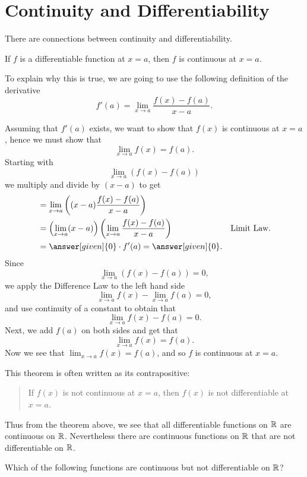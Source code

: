 \documentclass{ximera}
\begin{document}
\section{Continuity and Differentiability}

There are connections between continuity and differentiability.

\begin{theorem}
If $f$ is a differentiable function at $x = a$, then $f$ is continuous
at $x=a$.
\begin{explanation}
To explain why this is true, we are going to use the following
definition of the derivative
\[
f'(a) = \lim_{x\to a} \frac{f(x)-f(a)}{x-a}.
\]

  Assuming that $f'(a)$ exists, we want to show that $f(x)$ is
continuous at $x=a$, hence we must show that
\[
\lim_{x\to a} f(x) = f(a).
\]
Starting with
\[
\lim_{x\to a} \left(f(x) - f(a)\right)
\]
we multiply and divide by $(x-a)$ to get
\begin{align*}
  &= \lim_{x\to a} \left((x-a)\frac{f(x) - f(a)}{x-a}\right) \\
  &= \left(\lim_{x\to a} (x-a) \right) \left(\lim_{x\to a}\frac{f(x) - f(a)}{x-a}\right) &\text{Limit Law.} \\
  &= \answer[given]{0}\cdot f'(a) = \answer[given]{0}.
\end{align*}
Since 
\[
\lim_{x\to a}\left(f(x) - f(a)\right) = 0 ,
\]
we apply the Difference Law to the left hand side
\[
\lim_{x\to a}f(x) - \lim_{x\to a}f(a) = 0 ,
\]
and use continuity of a constant to obtain that
\[
\lim_{x\to a}f(x) - f(a) = 0 .
\]
Next, we add $f(a)$ on both sides and get that
\[
\lim_{x\to a}f(x) = f(a).
\]
Now we see that $\lim_{x\to a} f(x) = f(a)$, and so $f$ is continuous at
$x=a$.
\end{explanation}
\end{theorem}

This theorem is often written as its contrapositive:
\begin{quote}
If $f(x)$ is not continuous at $x=a$, then $f(x)$ is not
differentiable at $x=a$.
\end{quote}


Thus from the theorem above, we see that all differentiable functions
on $\mathbb R$ are continuous on $\mathbb R$. Nevertheless there are continuous
functions on $\mathbb R$ that are not differentiable on $\mathbb R$.

\begin{question}
  Which of the following functions are continuous but not
  differentiable on $\mathbb R$?
  \begin{multipleChoice}
  \end{multipleChoice}
\end{question}
\end{document}
